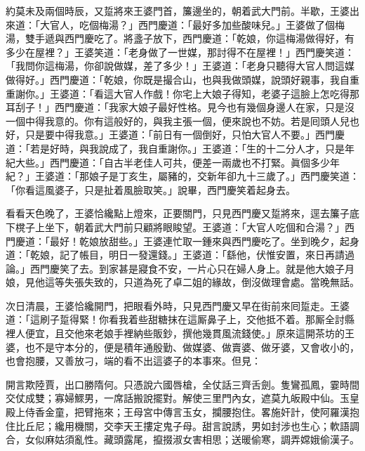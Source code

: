 約莫未及兩個時辰，又踅將來王婆門首，簾邊坐的，朝着武大門前。半歇，王婆出來道：「大官人，吃個梅湯？」西門慶道：「最好多加些酸味兒。」王婆做了個梅湯，雙手遞與西門慶吃了。將盞子放下，西門慶道：「乾娘，你這梅湯做得好，有多少在屋裡？」王婆笑道：「老身做了一世媒，那討得不在屋裡！」西門慶笑道：「我問你這梅湯，你卻說做媒，差了多少！」王婆道：「老身只聽得大官人問這媒做得好。」西門慶道：「乾娘，你既是撮合山，也與我做頭媒，說頭好親事，{}我自重重謝你。」王婆道：「看這大官人作戲！你宅上大娘子得知，老婆子這臉上怎吃得那耳刮子！」西門慶道：「我家大娘子最好性格。見今也有幾個身邊人在家，只是沒一個中得我意的。你有這般好的，與我主張一個，便來說也不妨。若是囘頭人兒也好，{}只是要中得我意。」王婆道：「前日有一個倒好，只怕大官人不要。」西門慶道：「若是好時，與我說成了，我自重謝你。」王婆道：「生的十二分人才，只是年紀大些。」西門慶道：「自古半老佳人可共，便差一兩歲也不打緊。眞個多少年紀？」王婆道：「那娘子是丁亥生，屬豬的，交新年卻九十三歲了。」{}西門慶笑道：「你看這風婆子，只是扯着風臉取笑。」說畢，西門慶笑着起身去。

看看天色晚了，王婆恰纔點上燈來，正要關門，只見西門慶又踅將來，逕去簾子底下櫈子上坐下，朝着武大門前只顧將眼睃望。{}王婆道：「大官人吃個和合湯？」西門慶道：「最好！乾娘放甜些。」王婆連忙取一鍾來與西門慶吃了。坐到晚夕，起身道：「乾娘，記了帳目，明日一發還錢。」王婆道：「繇他，伏惟安置，來日再請過論。」西門慶笑了去。到家甚是寢食不安，一片心只在婦人身上。就是他大娘子月娘，{}見他這等失張失致的，只道為死了卓二姐的緣故，倒沒做理會處。當晚無話。

次日清晨，王婆恰纔開門，把眼看外時，只見西門慶又早在街前來囘踅走。王婆道：「這刷子踅得緊！你看我着些甜糖抹在這厮鼻子上，交他抵不着。那厮全討縣裡人便宜，且交他來老娘手裡納些販鈔，撰他幾貫風流錢使。」原來這開茶坊的王婆，也不是守本分的，便是積年通殷勤、做媒婆、做賣婆、做牙婆，又會收小的，也會抱腰，又善放刁，端的看不出這婆子的本事來。但見：

\begin{myquote}
開言欺陸賈，出口勝隋何。只憑說六國唇槍，全仗話三齊舌劍。隻鸞孤鳳，霎時間交仗成雙；寡婦鰥男，一席話搬說擺對。解使三里門內女，遮莫九皈殿中仙。玉皇殿上侍香金童，把臂拖來；王母宮中傳言玉女，攔腰抱住。畧施奸計，使阿羅漢抱住比丘尼；纔用機關，交李天王摟定鬼子母。甜言說誘，男如封涉也生心；軟語調合，女似麻姑須亂性。藏頭露尾，攛掇淑女害相思；送暖偷寒，調弄嫦娥偷漢子。
\end{myquote}

